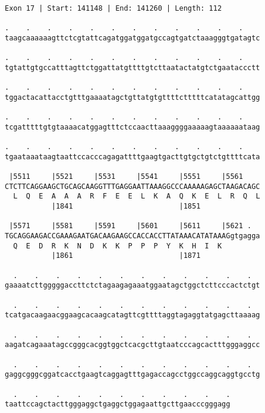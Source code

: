 \documentclass{article}
\begin{document}
\newpage
\begin{Verbatim}[fontfamily=courier]
Exon 17 | Start: 141148 | End: 141260 | Length: 112

.    .    .    .    .    .    .    .    .    .    .    .    
taagcaaaaaagttctcgtattcagatggatggatgccagtgatctaaagggtgatagtc

.    .    .    .    .    .    .    .    .    .    .    .    
tgtattgtgccatttagttctggattatgttttgtcttaatactatgtctgaataccctt

.    .    .    .    .    .    .    .    .    .    .    .    
tggactacattacctgtttgaaaatagctgttatgtgttttctttttcatatagcattgg

.    .    .    .    .    .    .    .    .    .    .    .    
tcgatttttgtgtaaaacatggagtttctccaacttaaaggggaaaaagtaaaaaataag

.    .    .    .    .    .    .    .    .    .    .    .    
tgaataaataagtaattccacccagagattttgaagtgacttgtgctgtctgttttcata

 |5511     |5521     |5531     |5541     |5551     |5561    
CTCTTCAGGAAGCTGCAGCAAGGTTTGAGGAATTAAAGGCCCAAAAAGAGCTAAGACAGC
  L  Q  E  A  A  A  R  F  E  E  L  K  A  Q  K  E  L  R  Q  L
           |1841                         |1851              

 |5571     |5581     |5591     |5601     |5611     |5621 .  
TGCAGGAAGACCGAAAGAATGACAAGAAGCCACCACCTTATAAACATATAAAGgtgagga
  Q  E  D  R  K  N  D  K  K  P  P  P  Y  K  H  I  K         
           |1861                         |1871              

  .    .    .    .    .    .    .    .    .    .    .    .  
gaaaatcttgggggaccttctctagaagagaaatggaatagctggctcttcccactctgt

  .    .    .    .    .    .    .    .    .    .    .    .  
tcatgacaagaacggaagcacaagcatagttcgttttaggtagaggtatgagcttaaaag

  .    .    .    .    .    .    .    .    .    .    .    .  
aagatcagaaatagccgggcacggtggctcacgcttgtaatcccagcactttgggaggcc

  .    .    .    .    .    .    .    .    .    .    .    .  
gaggcgggcggatcacctgaagtcaggagtttgagaccagcctggccaggcaggtgcctg

  .    .    .    .    .    .    .    .    .    .    .
taattccagctacttgggaggctgaggctggagaattgcttgaacccgggagg
\end{Verbatim}
\newpage
\end{document}
